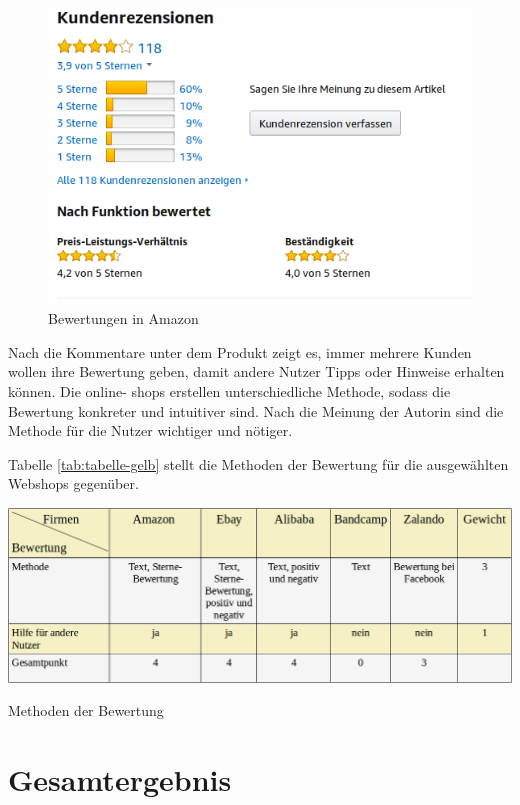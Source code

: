 \begin{figure}[htbp]
	\centering
	\includegraphics[width=1\textwidth]{bilder/bewertung-amazon.png}
	\caption{Bewertungen in Amazon}
	\label{fig:bewertung-amazon}
\end{figure}

Nach die Kommentare unter dem Produkt zeigt es, immer mehrere Kunden wollen ihre Bewertung geben, damit andere Nutzer Tipps oder Hinweise erhalten können. Die online- shops erstellen unterschiedliche Methode, sodass die Bewertung konkreter und intuitiver sind. Nach die Meinung der Autorin sind die Methode für die Nutzer wichtiger und nötiger.

Tabelle \vref{tab:tabelle-gelb} stellt die Methoden der Bewertung für die ausgewählten Webshops gegenüber.

\begin{table}[htbp]
	\centering
	\includegraphics[width=1\textwidth]{bilder/tabelle-gelb.png}
	\caption{Methoden der Bewertung}
	\label{tab:tabelle-gelb}
\end{table}

\newpage


\section{Gesamtergebnis}

